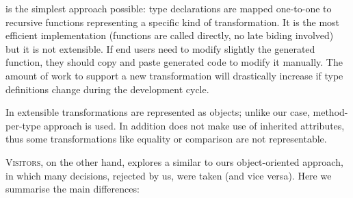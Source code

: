  is the simplest approach possible: type declarations are mapped one-to-one to recursive functions representing a specific kind of
transformation. It is the most efficient implementation (functions are called directly, no late biding involved) but it is not extensible. If end users
need to modify slightly the generated function, they should copy and paste generated code to modify it manually. The amount of work to support a new
transformation will drastically increase if type definitions change during the development cycle.

In  extensible transformations are represented as objects; unlike our case, method-per-type approach is used. In addition 
 does not make use of inherited attributes, thus some transformations like equality or comparison are not representable.

\textsc{Visitors}, on the other hand, explores a similar to ours object-oriented approach, in which many decisions, rejected by us, were taken (and vice versa). Here
we summarise the main differences:

